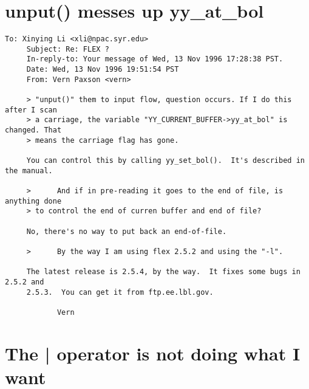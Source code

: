 \documentclass[openany,oneside]{book}
\begin{document}
\section{unput() messes up yy\_{}at\_{}bol}

\begin{verbatim}
To: Xinying Li <xli@npac.syr.edu>
     Subject: Re: FLEX ?
     In-reply-to: Your message of Wed, 13 Nov 1996 17:28:38 PST.
     Date: Wed, 13 Nov 1996 19:51:54 PST
     From: Vern Paxson <vern>
     
     > "unput()" them to input flow, question occurs. If I do this after I scan
     > a carriage, the variable "YY_CURRENT_BUFFER->yy_at_bol" is changed. That
     > means the carriage flag has gone.
     
     You can control this by calling yy_set_bol().  It's described in the manual.
     
     >      And if in pre-reading it goes to the end of file, is anything done
     > to control the end of curren buffer and end of file?
     
     No, there's no way to put back an end-of-file.
     
     >      By the way I am using flex 2.5.2 and using the "-l".
     
     The latest release is 2.5.4, by the way.  It fixes some bugs in 2.5.2 and
     2.5.3.  You can get it from ftp.ee.lbl.gov.
     
     		Vern
\end{verbatim}

\section{The | operator is not doing what I want}
\end{document}

